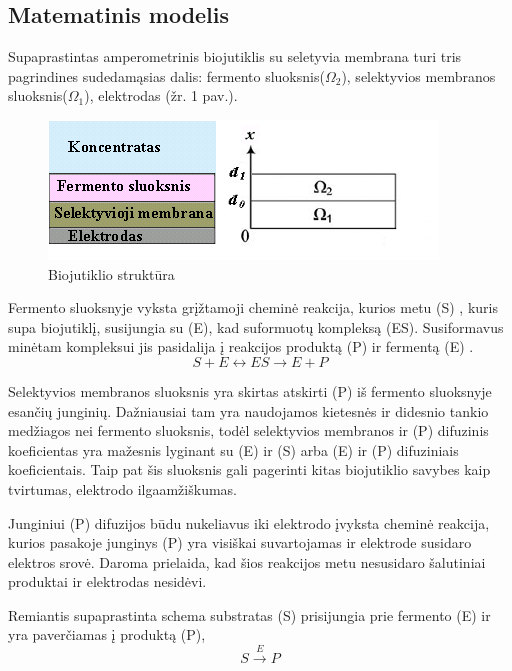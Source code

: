 \documentclass[12pt, a4paper, lithuanian]{article}
\begin{document}
\subsection{Matematinis modelis}

Supaprastintas amperometrinis biojutiklis su seletyvia membrana turi tris
pagrindines sudedamąsias dalis: fermento sluoksnis($\Omega_2$),
selektyvios
membranos sluoksnis($\Omega_1$), elektrodas (žr. 1 pav.).
\begin{figure}[H]
    \centering
    \includegraphics[scale=0.9]{img/modv1}
    \caption{Biojutiklio struktūra}
    \label{biojutiklio-struktura}
\end{figure}

Fermento sluoksnyje vyksta grįžtamoji cheminė reakcija, kurios metu (S)
, kuris supa biojutiklį,
susijungia su (E), kad suformuotų kompleksą (ES). Susiformavus minėtam
kompleksui jis pasidalija į reakcijos produktą (P) ir fermentą (E)
\cite{baronas2009mathematical}.  
\begin{equation}
    S + E \leftrightarrow ES \rightarrow E + P
\end{equation}

Selektyvios membranos sluoksnis yra skirtas atskirti (P) iš fermento sluoksnyje esančių
junginių. Dažniausiai tam yra naudojamos kietesnės ir didesnio tankio medžiagos
nei fermento sluoksnis, todėl selektyvios membranos ir (P) difuzinis
koeficientas yra mažesnis lyginant su (E) ir (S) arba (E) ir (P) difuziniais
koeficientais. Taip pat šis sluoksnis gali pagerinti kitas biojutiklio savybes kaip
tvirtumas, elektrodo ilgaamžiškumas. 

Junginiui (P) difuzijos būdu nukeliavus iki elektrodo įvyksta cheminė reakcija,
kurios pasakoje junginys (P) yra visiškai suvartojamas ir elektrode susidaro
elektros srovė. Daroma prielaida, kad šios reakcijos metu nesusidaro šalutiniai
produktai ir elektrodas nesidėvi.

Remiantis supaprastinta schema substratas (S) prisijungia prie fermento (E)
ir yra
paverčiamas į produktą (P),
\begin{equation}\label{eq:basic}
    S \overset{E}{\rightarrow} P
\end{equation}
\end{document}
